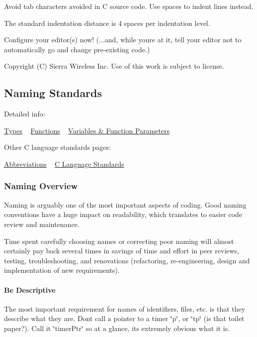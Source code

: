 Avoid tab characters avoided in C source code. Use spaces to indent lines instead.

The standard indentation distance is 4 spaces per indentation level.

Configure your editor(s) now! (...and, while you\textquotesingle{}re at it, tell your editor not to automatically go and change pre-\/existing code.)





Copyright (C) Sierra Wireless Inc. Use of this work is subject to license. \hypertarget{ccodingStdsNaming}{}\subsection{Naming Standards}\label{ccodingStdsNaming}
Detailed info\+:

\hyperlink{ccodingStdsNameTypes}{Types} ~\newline
 \hyperlink{ccodingStdsNameFuncs}{Functions} ~\newline
 \hyperlink{ccodingStdsParam}{Variables \& Function Parameters}

Other C language standards\textquotesingle{} pages\+:

\hyperlink{ccodingStdsAbbr}{Abbreviations} ~\newline
 \hyperlink{ccodingStdsMain}{C Language Standards}\hypertarget{ccoding_stds_naming_cstdsNaming}{}\subsubsection{Naming Overview}\label{ccoding_stds_naming_cstdsNaming}
Naming is arguably one of the most important aspects of coding. Good naming conventions have a huge impact on readability, which translates to easier code review and maintenance.

Time spent carefully choosing names or correcting poor naming will almost certainly pay back several times in savings of time and effort in peer reviews, testing, troubleshooting, and renovations (refactoring, re-\/engineering, design and implementation of new requirements).\hypertarget{ccoding_stds_naming_descript}{}\paragraph{Be Descriptive}\label{ccoding_stds_naming_descript}
The most important requirement for names of identifiers, files, etc. is that they describe what they are. Don\textquotesingle{}t call a pointer to a timer \char`\"{}p\char`\"{}, or \char`\"{}tp\char`\"{} (is that toilet paper?). Call it \char`\"{}timer\+Ptr\char`\"{} so at a glance, it\textquotesingle{}s extremely obvious what it is.


